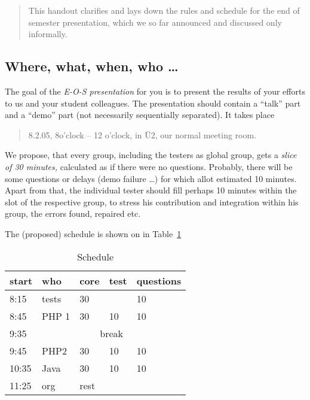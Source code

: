 \documentclass[11pt,handout,nologo]{handout}
\begin{document}
\thispagestyle{empty}





\begin{abstract}
  This handout clarifies and lays down the rules and schedule for the end
  of semester presentation, which we so far announced and discussed only
  informally.
\end{abstract}



\subsection*{Where, what, when, who \ldots}

The goal of the \emph{E-O-S presentation} for you is to present the results
of your efforts to us and your student colleagues. The presentation should
contain a ``talk'' part and a ``demo'' part (not necessarily sequentially
separated). It takes place
\begin{quotation}
  8.2.05, 8o'clock -- 12 o'clock, in {\"U}2, our normal meeting room.
\end{quotation}

We propose, that every group, including the testers as global group, gets a
\emph{slice of 30 minutes,} calculated as if there were no questions.
Probably, there will be some questions or delays (demo failure \ldots) for
which allot estimated 10 minutes. Apart from that, the individual tester
should fill perhaps 10 minutes within the slot of the respective group, to
stress his contribution and integration within his group, the errors
found, repaired etc.

The (proposed) schedule is shown on in Table~\ref{tab:schedule}



\begin{table}[htbp]
  \centering
  \begin{tabular}[t]{l|llll}
    start &  who & core &  test & questions
    \\\hline
    8:15 & tests & 30 & & 10
    \\
    8:45 & PHP 1 & 30 & 10 &10
    \\
    9:35 & \multicolumn{4}{c}{break}
    \\
    9:45 & PHP2 & 30 &10 &10
    \\
    10:35 & Java & 30 & 10 & 10
    \\
    11:25 & org & rest
  \end{tabular}
  \caption{Schedule}
  \label{tab:schedule}
\end{table}
\end{document}
